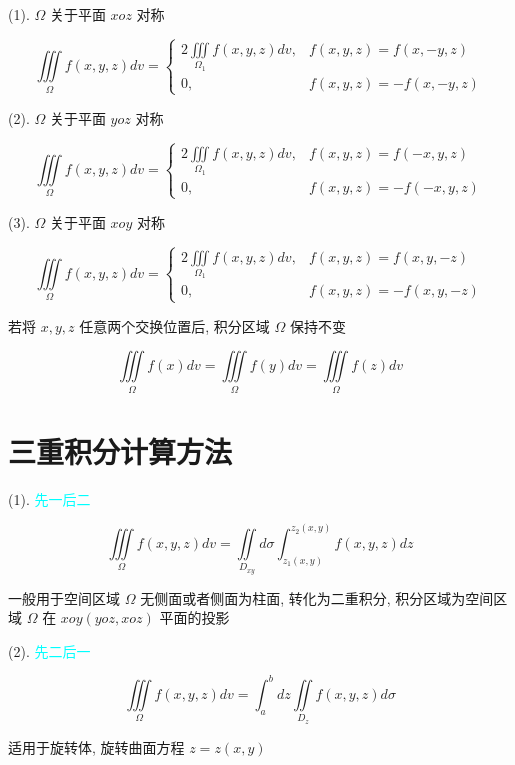 \begin{definition}[普通对称性]
	(1). $\Omega$ 关于平面 $xoz$ 对称

	$$\iiint\limits_{\Omega}f(x,y,z)dv = 
	\begin{cases}
		2\iiint\limits_{\Omega_{1}}f(x,y,z)dv, & f(x,y,z) = f(x,-y,z)\\
		0,                                     & f(x,y,z) = -f(x,-y,z)
	\end{cases}$$

	(2). $\Omega$ 关于平面 $yoz$ 对称

	$$\iiint\limits_{\Omega}f(x,y,z)dv =
	\begin{cases}
		2\iiint\limits_{\Omega_{1}}f(x,y,z)dv, & f(x,y,z) = f(-x,y,z)\\
		0,                                     & f(x,y,z) = -f(-x,y,z)
	\end{cases}$$

	(3). $\Omega$ 关于平面 $xoy$ 对称

	$$\iiint\limits_{\Omega}f(x,y,z)dv =
	\begin{cases}
		2\iiint\limits_{\Omega_{1}}f(x,y,z)dv, & f(x,y,z) = f(x,y,-z)\\
		0,                                     & f(x,y,z) = -f(x,y,-z)
	\end{cases}$$

\end{definition}

\begin{definition}[轮换对称性]
	若将 $x,y,z$ 任意两个交换位置后, 积分区域 $\Omega$ 保持不变

	$$\iiint\limits_{\Omega}f(x)dv=\iiint\limits_{\Omega}f(y)dv=\iiint\limits_{\Omega}f(z)dv$$
\end{definition}

\section{三重积分计算方法}


\begin{definition}[直角坐标系]
	(1). \textcolor{cyan}{先一后二}

	$$\iiint\limits_{\Omega}f(x,y,z)dv=\iint\limits_{D_{xy}}d\sigma \int_{z_{1}(x,y)}^{z_{2}(x,y)}f(x,y,z)dz$$
	
	一般用于空间区域 $\Omega$ 无侧面或者侧面为柱面, 转化为二重积分, 积分区域为空间区域 $\Omega$ 在 $xoy(yoz,xoz)$ 平面的投影
	
	(2). \textcolor{cyan}{先二后一}

	$$\iiint\limits_{\Omega}f(x,y,z)dv = \int_{a}^{b}dz\iint\limits_{D_{z}}f(x,y,z)d\sigma$$
	
	适用于旋转体, 旋转曲面方程 $z = z(x,y)$
\end{definition}

